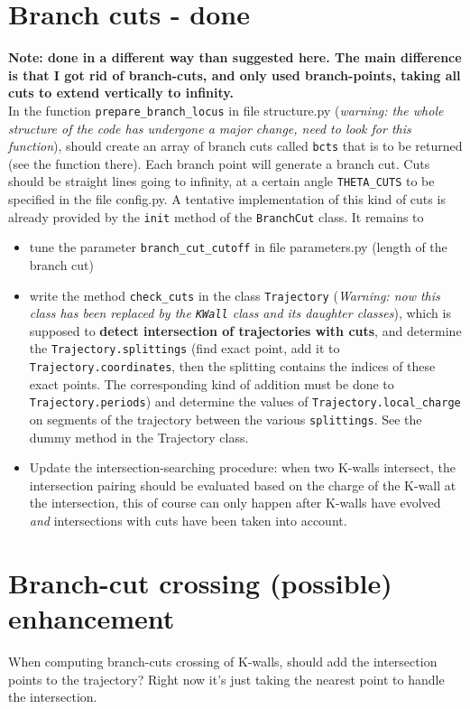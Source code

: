 \documentclass[11pt]{report}
\begin{document}
\section{Branch cuts - {\color{red} \bf done}}
{\bf \color{blue} \large Note: done in a different way than suggested here. The main difference is that I got rid of branch-cuts, and only used branch-points, taking all cuts to extend vertically to infinity.}\\
In the function {\tt prepare\_branch\_locus} in file structure.py (\emph{warning: the whole structure of the code has undergone a major change, need to look for this function}), should create an array of branch cuts called {\tt bcts} that is to be returned (see the function there).
Each branch point will generate a branch cut. Cuts should be straight lines going to infinity, at a certain angle {\tt THETA\_CUTS} to be specified in the file {config.py}. A tentative implementation of this kind of cuts is already provided by the {\tt init} method of the {\tt BranchCut} class.
It remains to
\begin{itemize}
\item tune the parameter {\tt branch\_cut\_cutoff} in file parameters.py (length of the branch cut)
\item write the method {\tt check\_{cuts}} in the class {\tt Trajectory} (\emph{Warning: now this class has been replaced by the {\tt KWall} class and its daughter classes}), which is supposed to {\bf detect intersection of trajectories with cuts}, and determine the {\tt Trajectory.splittings} (find exact point, add it to {\tt Trajectory.coordinates}, then the splitting contains the indices of these exact points. The corresponding kind of addition must be done to {\tt Trajectory.periods}) and determine the values of {\tt Trajectory.local\_{charge}} on segments of the trajectory between the various {\tt splittings}. See the dummy method in the Trajectory class.
\item Update the intersection-searching procedure: when two K-walls intersect, the intersection pairing should be evaluated based on the charge of the K-wall at the intersection, this of course can only happen after K-walls have evolved \emph{and} intersections with cuts have been taken into account.
\end{itemize}


\section{Branch-cut crossing (possible) enhancement}
When computing branch-cuts crossing of K-walls, should add the intersection points to the trajectory? 
Right now it's just taking the nearest point to handle the intersection.
\end{document}
